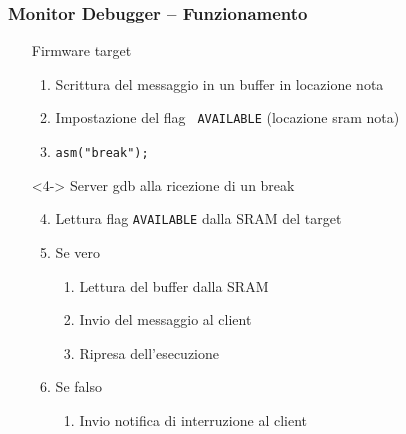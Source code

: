 \documentclass[aspectratio=169,
]{beamer}
\begin{document}
    \begin{frame}
        \frametitle{Monitor Debugger -- Funzionamento}
        \hspace*{-10mm}\begin{minipage}{.7\textwidth}
            \begin{itemize}
                \item[] {\color{blue} Firmware target}
                \begin{enumerate}
                    \item <1-> Scrittura del messaggio in un {\color{purple} buffer} in locazione nota
                    \item <2-> Impostazione del flag \texttt{\color{red} AVAILABLE} (locazione sram nota)
                    \item <3-> \texttt{asm("break");}
                \end{enumerate}
                \item[] <4-> {\color{orange} Server gdb} alla ricezione di un break
                \begin{enumerate}
                    \setcounter{enumi}{3}
                    \item <4-> Lettura flag {\color{red} \texttt{AVAILABLE}} dalla {\color{gray} SRAM} del target
                    \item <5-> Se vero
                    \begin{enumerate}
                        \item <5-> Lettura del {\color{purple} buffer} dalla SRAM
                        \item <5-> Invio del messaggio al {\color{brown} client}
                        \item <5-> Ripresa dell'esecuzione
                    \end{enumerate}
                    \item <6-> Se falso
                    \begin{enumerate}
                        \item <6-> Invio notifica di interruzione al {\color{brown} client}
                    \end{enumerate}
                \end{enumerate}
            \end{itemize}     
        \end{minipage}
        \begin{minipage}{.28\textwidth}
            \begin{figure}
                \begin{tikzpicture}[scale=.8, label distance=-2mm]


\end{tikzpicture}
\end{figure}
\end{minipage}
\end{frame}
\end{document}
